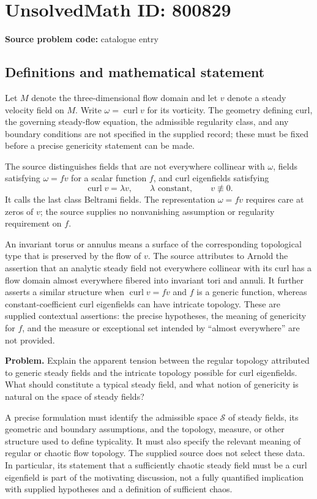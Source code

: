 \documentclass[11pt]{article}
\begin{document}
\section*{UnsolvedMath ID: 800829}
\textbf{Source problem code:} catalogue entry
\subsection{Definitions and mathematical statement}
Let \(M\) denote the three-dimensional flow domain and let \(v\) denote a steady velocity field on \(M\). Write \(\omega=\operatorname{curl}v\) for its vorticity. The geometry defining curl, the governing steady-flow equation, the admissible regularity class, and any boundary conditions are not specified in the supplied record; these must be fixed before a precise genericity statement can be made.

The source distinguishes fields that are not everywhere collinear with \(\omega\), fields satisfying \(\omega=fv\) for a scalar function \(f\), and curl eigenfields satisfying
\[
\operatorname{curl}v=\lambda v,
\qquad \lambda\text{ constant},\qquad v\not\equiv0.
\]
It calls the last class Beltrami fields. The representation \(\omega=fv\) requires care at zeros of \(v\); the source supplies no nonvanishing assumption or regularity requirement on \(f\).

An invariant torus or annulus means a surface of the corresponding topological type that is preserved by the flow of \(v\). The source attributes to Arnold the assertion that an analytic steady field not everywhere collinear with its curl has a flow domain almost everywhere fibered into invariant tori and annuli. It further asserts a similar structure when \(\operatorname{curl}v=fv\) and \(f\) is a generic function, whereas constant-coefficient curl eigenfields can have intricate topology. These are supplied contextual assertions: the precise hypotheses, the meaning of genericity for \(f\), and the measure or exceptional set intended by ``almost everywhere'' are not provided.

\textbf{Problem.} Explain the apparent tension between the regular topology attributed to generic steady fields and the intricate topology possible for curl eigenfields. What should constitute a typical steady field, and what notion of genericity is natural on the space of steady fields?

A precise formulation must identify the admissible space \(\mathcal S\) of steady fields, its geometric and boundary assumptions, and the topology, measure, or other structure used to define typicality. It must also specify the relevant meaning of regular or chaotic flow topology. The supplied source does not select these data. In particular, its statement that a sufficiently chaotic steady field must be a curl eigenfield is part of the motivating discussion, not a fully quantified implication with supplied hypotheses and a definition of sufficient chaos.
\end{document}
